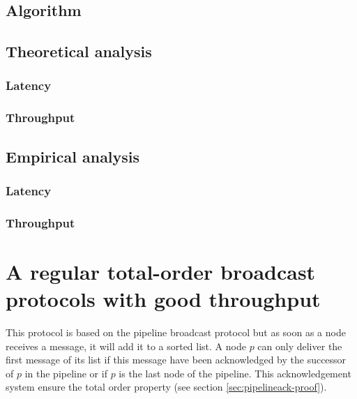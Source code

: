 \documentclass[a4paper]{article}
\begin{document}
        \subsection{Algorithm}

        \subsection{Theoretical analysis}

        \subsubsection*{Latency}

        \subsubsection*{Throughput}

        \subsection{Empirical analysis}

        \subsubsection*{Latency}

        \subsubsection*{Throughput}

        \section{A regular total-order broadcast protocols with good throughput}
        \label{sec:throughputTO}

        This protocol is based on the pipeline broadcast protocol but as soon as a node
        receives a message, it will add it to a sorted list. A node $p$ can only deliver the
        first message of its list if this message have been acknowledged by the
        successor of $p$ in the pipeline or if $p$ is the last node of the pipeline.
        This acknowledgement system ensure the total order property (see section
        \ref{sec:pipelineack-proof}).
\end{document}
